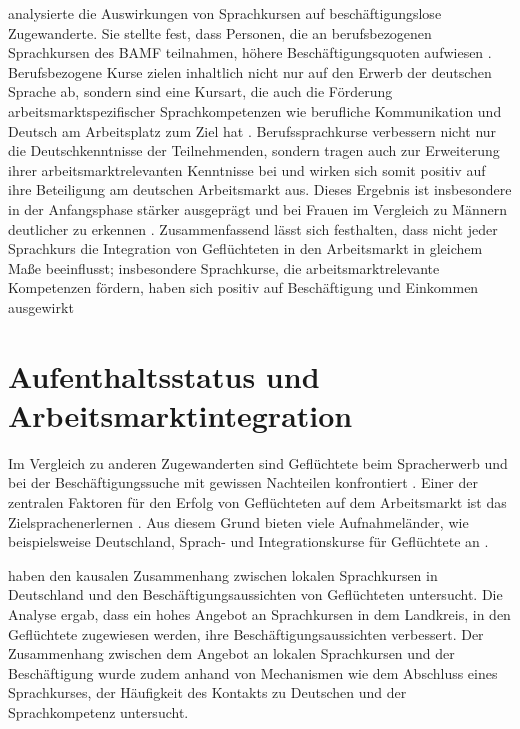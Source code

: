 \textcite{lang2022employment} analysierte die Auswirkungen von Sprachkursen auf beschäftigungslose Zugewanderte. Sie stellte fest, dass Personen, die an berufsbezogenen Sprachkursen des BAMF teilnahmen, höhere Beschäftigungsquoten aufwiesen \parencite{lang2022employment}. Berufsbezogene Kurse zielen inhaltlich nicht nur auf den Erwerb der deutschen Sprache ab, sondern sind eine Kursart, die auch die Förderung arbeitsmarktspezifischer Sprachkompetenzen wie berufliche Kommunikation und Deutsch am Arbeitsplatz zum Ziel hat \parencite{lang2022employment}. Berufssprachkurse verbessern nicht nur die Deutschkenntnisse der Teilnehmenden, sondern tragen auch zur Erweiterung ihrer arbeitsmarktrelevanten Kenntnisse bei und wirken sich somit positiv auf ihre Beteiligung am deutschen Arbeitsmarkt aus. Dieses Ergebnis ist insbesondere in der Anfangsphase stärker ausgeprägt und bei Frauen im Vergleich zu Männern deutlicher zu erkennen \parencite{lang2022employment}. Zusammenfassend lässt sich festhalten, dass nicht jeder Sprachkurs die Integration von Geflüchteten in den Arbeitsmarkt in gleichem Maße beeinflusst; insbesondere Sprachkurse, die arbeitsmarktrelevante Kompetenzen fördern, haben sich positiv auf Beschäftigung und Einkommen ausgewirkt \parencite{lang2022employment}

\section{Aufenthaltsstatus und Arbeitsmarktintegration}
\label{cha:aufenthaltsstatus}

Im Vergleich zu anderen Zugewanderten sind Geflüchtete beim Spracherwerb und bei der Beschäftigungssuche mit gewissen Nachteilen konfrontiert \parencites{10.3389/fpos.2022.977764}{10.1093/epolic/eix008}. Einer der zentralen Faktoren für den Erfolg von Geflüchteten auf dem Arbeitsmarkt ist das Zielsprachenerlernen \parencite{Kosyakova04042022}. Aus diesem Grund bieten viele Aufnahmeländer, wie beispielsweise Deutschland, Sprach- und Integrationskurse für Geflüchtete an \parencite{kristen2021destination}.

\textcite{Kanas:2023} haben den kausalen Zusammenhang zwischen lokalen Sprachkursen in Deutschland und den Beschäftigungsaussichten von Geflüchteten untersucht. Die Analyse ergab, dass ein hohes Angebot an Sprachkursen in dem Landkreis, in den Geflüchtete zugewiesen werden, ihre Beschäftigungsaussichten verbessert. Der Zusammenhang zwischen dem Angebot an lokalen Sprachkursen und der Beschäftigung wurde zudem anhand von Mechanismen wie dem Abschluss eines Sprachkurses, der Häufigkeit des Kontakts zu Deutschen und der Sprachkompetenz untersucht.


